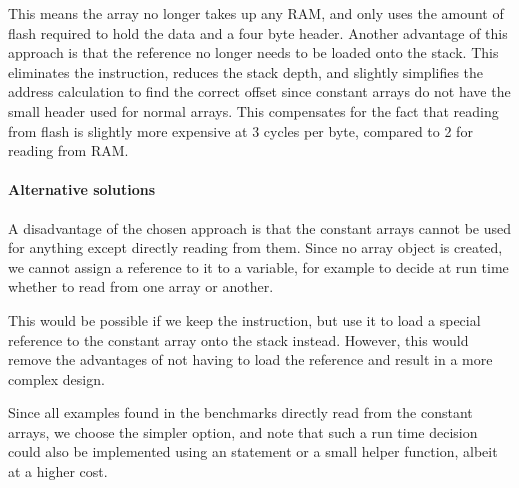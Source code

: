 This means the array no longer takes up any RAM, and only uses the amount of flash required to hold the data and a four byte header. Another advantage of this approach is that the reference no longer needs to be loaded onto the stack. This eliminates the  instruction, reduces the stack depth, and slightly simplifies the address calculation to find the correct offset since constant arrays do not have the small header used for normal arrays. This compensates for the fact that reading from flash is slightly more expensive at 3 cycles per byte, compared to 2 for reading from RAM. 

\paragraph{Alternative solutions}
A disadvantage of the chosen approach is that the constant arrays cannot be used for anything except directly reading from them. Since no array object is created, we cannot assign a reference to it to a variable, for example to decide at run time whether to read from one array or another.

This would be possible if we keep the  instruction, but use it to load a special reference to the constant array onto the stack instead. However, this would remove the advantages of not having to load the reference and result in a more complex design.

Since all examples found in the benchmarks directly read from the constant arrays, we choose the simpler option, and note that such a run time decision could also be implemented using an  statement or a small helper function, albeit at a higher cost. 
